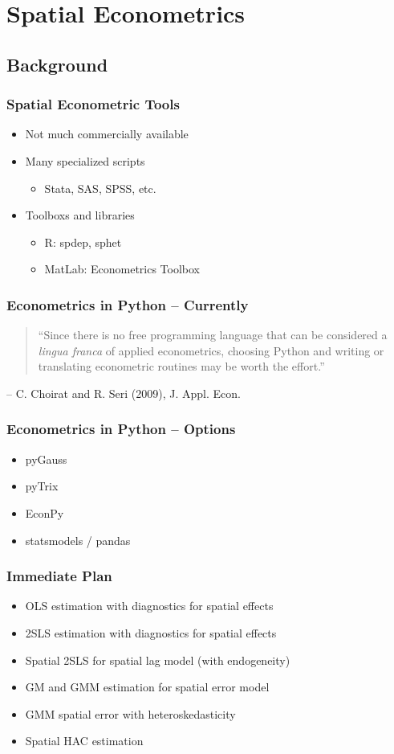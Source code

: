 \section{Spatial Econometrics} 

\subsection{Background} 

\begin{frame}
	\frametitle{Spatial Econometric Tools}
 \begin{itemize}
 \item Not much commercially available
 \item Many specialized scripts
 \begin{itemize}
 \item Stata, SAS, SPSS, etc.
 \end{itemize}
 \item Toolboxs and libraries
 \begin{itemize}
 \item R: spdep, sphet
 \item MatLab: Econometrics Toolbox
 \end{itemize}
 \end{itemize}
 \end{frame} 

\begin{frame}
	\frametitle{Econometrics in Python -- Currently}
  \begin{quote}
  ``Since there is no free programming language that can be
  considered a \emph{lingua franca} of applied econometrics, choosing
  Python and writing or translating econometric routines may be
  worth the effort.''
  \end{quote}
  \qquad\qquad\qquad\qquad -- C. Choirat and R. Seri (2009), J. Appl. Econ.
 \end{frame} 

\begin{frame}
	\frametitle{Econometrics in Python -- Options}
 \begin{itemize}
 \item pyGauss
 \item pyTrix
 \item EconPy
 \item statsmodels / pandas
 \end{itemize}
 \end{frame} 

\begin{frame}
	\frametitle{Immediate Plan}
 \begin{itemize}
 \item OLS estimation with diagnostics for spatial effects
 \item 2SLS estimation with diagnostics for spatial effects
 \item Spatial 2SLS for spatial lag model (with endogeneity)
 \item GM and GMM estimation for spatial error model
 \item GMM spatial error with heteroskedasticity
 \item Spatial HAC estimation
 \end{itemize}
 \end{frame} 

